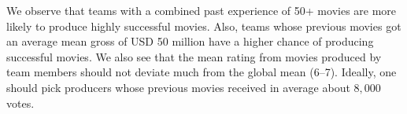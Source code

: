 We observe that teams with a combined past
experience of 50+ movies are more likely to produce highly successful movies.
Also, teams whose previous movies got an average mean gross of USD 50 million
have a higher chance of producing successful movies. We also see that the mean
rating from movies produced by team members should not deviate much from the
global mean (6--7). Ideally, one should pick producers whose previous
movies received in average about $8,000$ votes.
